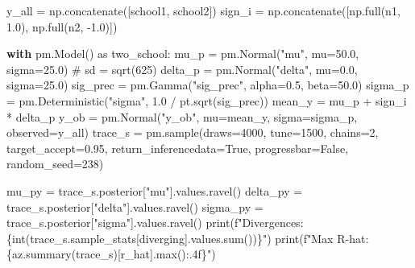 \documentclass[
  letterpaper,
  DIV=11,
  numbers=noendperiod]{scrartcl}
\newenvironment{Shaded}{\begin{snugshade}}{\end{snugshade}}
\newcommand{\BuiltInTok}[1]{\textcolor[rgb]{0.00,0.23,0.31}{#1}}
\newcommand{\CommentTok}[1]{\textcolor[rgb]{0.37,0.37,0.37}{#1}}
\newcommand{\ControlFlowTok}[1]{\textcolor[rgb]{0.00,0.23,0.31}{\textbf{#1}}}
\newcommand{\DecValTok}[1]{\textcolor[rgb]{0.68,0.00,0.00}{#1}}
\newcommand{\FloatTok}[1]{\textcolor[rgb]{0.68,0.00,0.00}{#1}}
\newcommand{\ImportTok}[1]{\textcolor[rgb]{0.00,0.46,0.62}{#1}}
\newcommand{\NormalTok}[1]{\textcolor[rgb]{0.00,0.23,0.31}{#1}}
\newcommand{\OperatorTok}[1]{\textcolor[rgb]{0.37,0.37,0.37}{#1}}
\newcommand{\SpecialCharTok}[1]{\textcolor[rgb]{0.37,0.37,0.37}{#1}}
\newcommand{\SpecialStringTok}[1]{\textcolor[rgb]{0.13,0.47,0.30}{#1}}
\newcommand{\StringTok}[1]{\textcolor[rgb]{0.13,0.47,0.30}{#1}}
\newcommand{\VariableTok}[1]{\textcolor[rgb]{0.07,0.07,0.07}{#1}}
\begin{document}
\begin{Shaded}
\begin{Highlighting}[]
\NormalTok{y\_all  }\OperatorTok{=}\NormalTok{ np.concatenate([school1, school2])}
\NormalTok{sign\_i }\OperatorTok{=}\NormalTok{ np.concatenate([np.full(n1, }\FloatTok{1.0}\NormalTok{), np.full(n2, }\OperatorTok{{-}}\FloatTok{1.0}\NormalTok{)])}

\ControlFlowTok{with}\NormalTok{ pm.Model() }\ImportTok{as}\NormalTok{ two\_school:}
\NormalTok{    mu\_p    }\OperatorTok{=}\NormalTok{ pm.Normal(}\StringTok{"mu"}\NormalTok{, mu}\OperatorTok{=}\FloatTok{50.0}\NormalTok{, sigma}\OperatorTok{=}\FloatTok{25.0}\NormalTok{)        }\CommentTok{\# sd = sqrt(625)}
\NormalTok{    delta\_p }\OperatorTok{=}\NormalTok{ pm.Normal(}\StringTok{"delta"}\NormalTok{, mu}\OperatorTok{=}\FloatTok{0.0}\NormalTok{,  sigma}\OperatorTok{=}\FloatTok{25.0}\NormalTok{)}
\NormalTok{    sig\_prec }\OperatorTok{=}\NormalTok{ pm.Gamma(}\StringTok{"sig\_prec"}\NormalTok{, alpha}\OperatorTok{=}\FloatTok{0.5}\NormalTok{, beta}\OperatorTok{=}\FloatTok{50.0}\NormalTok{)}
\NormalTok{    sigma\_p }\OperatorTok{=}\NormalTok{ pm.Deterministic(}\StringTok{"sigma"}\NormalTok{, }\FloatTok{1.0} \OperatorTok{/}\NormalTok{ pt.sqrt(sig\_prec))}
\NormalTok{    mean\_y  }\OperatorTok{=}\NormalTok{ mu\_p }\OperatorTok{+}\NormalTok{ sign\_i }\OperatorTok{*}\NormalTok{ delta\_p}
\NormalTok{    y\_ob    }\OperatorTok{=}\NormalTok{ pm.Normal(}\StringTok{"y\_ob"}\NormalTok{, mu}\OperatorTok{=}\NormalTok{mean\_y, sigma}\OperatorTok{=}\NormalTok{sigma\_p, observed}\OperatorTok{=}\NormalTok{y\_all)}
\NormalTok{    trace\_s }\OperatorTok{=}\NormalTok{ pm.sample(draws}\OperatorTok{=}\DecValTok{4000}\NormalTok{, tune}\OperatorTok{=}\DecValTok{1500}\NormalTok{, chains}\OperatorTok{=}\DecValTok{2}\NormalTok{, target\_accept}\OperatorTok{=}\FloatTok{0.95}\NormalTok{,}
\NormalTok{                        return\_inferencedata}\OperatorTok{=}\VariableTok{True}\NormalTok{, progressbar}\OperatorTok{=}\VariableTok{False}\NormalTok{,}
\NormalTok{                        random\_seed}\OperatorTok{=}\DecValTok{238}\NormalTok{)}

\NormalTok{mu\_py    }\OperatorTok{=}\NormalTok{ trace\_s.posterior[}\StringTok{"mu"}\NormalTok{].values.ravel()}
\NormalTok{delta\_py }\OperatorTok{=}\NormalTok{ trace\_s.posterior[}\StringTok{"delta"}\NormalTok{].values.ravel()}
\NormalTok{sigma\_py }\OperatorTok{=}\NormalTok{ trace\_s.posterior[}\StringTok{"sigma"}\NormalTok{].values.ravel()}
\BuiltInTok{print}\NormalTok{(}\SpecialStringTok{f"Divergences: }\SpecialCharTok{\{}\BuiltInTok{int}\NormalTok{(trace\_s.sample\_stats[}\StringTok{\textquotesingle{}diverging\textquotesingle{}}\NormalTok{].values.}\BuiltInTok{sum}\NormalTok{())}\SpecialCharTok{\}}\SpecialStringTok{"}\NormalTok{)}
\BuiltInTok{print}\NormalTok{(}\SpecialStringTok{f"Max R{-}hat: }\SpecialCharTok{\{}\NormalTok{az}\SpecialCharTok{.}\NormalTok{summary(trace\_s)[}\StringTok{\textquotesingle{}r\_hat\textquotesingle{}}\NormalTok{]}\SpecialCharTok{.}\BuiltInTok{max}\NormalTok{()}\SpecialCharTok{:.4f\}}\SpecialStringTok{"}\NormalTok{)}


\end{Highlighting}
\end{Shaded}
\end{document}

